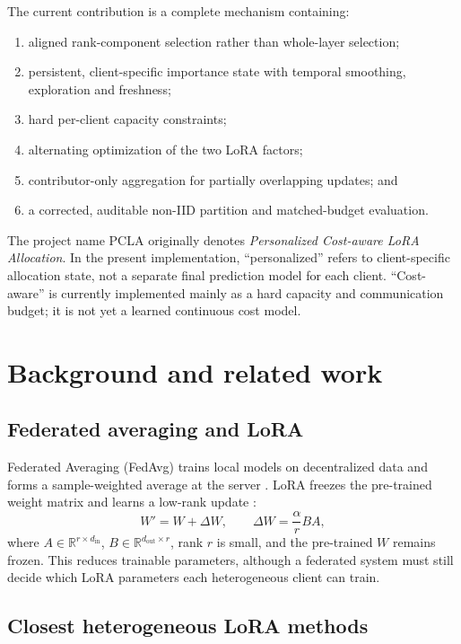 \documentclass[11pt,a4paper]{article}
\begin{document}
The current contribution is a complete mechanism containing:
\begin{enumerate}[leftmargin=1.6em]
  \item aligned rank-component selection rather than whole-layer selection;
  \item persistent, client-specific importance state with temporal smoothing,
  exploration and freshness;
  \item hard per-client capacity constraints;
  \item alternating optimization of the two LoRA factors;
  \item contributor-only aggregation for partially overlapping updates; and
  \item a corrected, auditable non-IID partition and matched-budget evaluation.
\end{enumerate}

The project name PCLA originally denotes \emph{Personalized Cost-aware LoRA
Allocation}. In the present implementation, ``personalized'' refers to
client-specific allocation state, not a separate final prediction model for
each client. ``Cost-aware'' is currently implemented mainly as a hard capacity
and communication budget; it is not yet a learned continuous cost model.

\section{Background and related work}

\subsection{Federated averaging and LoRA}

Federated Averaging (FedAvg) trains local models on decentralized data and
forms a sample-weighted average at the server \cite{fedavg}. LoRA freezes the
pre-trained weight matrix and learns a low-rank update
\cite{lora}:
\begin{equation}
  W' = W + \Delta W,\qquad
  \Delta W = \frac{\alpha}{r}BA,
  \label{eq:lora}
\end{equation}
where $A\in\mathbb{R}^{r\times d_{\mathrm{in}}}$,
$B\in\mathbb{R}^{d_{\mathrm{out}}\times r}$, rank $r$ is small, and the
pre-trained $W$ remains frozen. This reduces trainable parameters, although a
federated system must still decide which LoRA parameters each heterogeneous
client can train.

\subsection{Closest heterogeneous LoRA methods}
\end{document}
